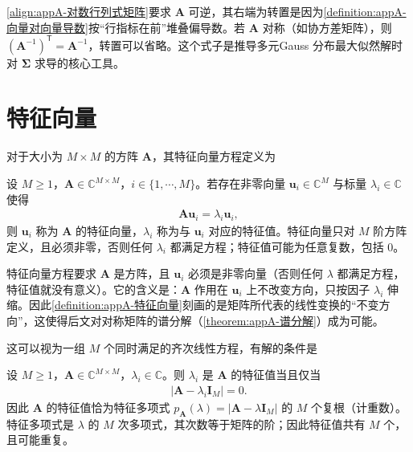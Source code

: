 \documentclass[../main.tex]{subfiles}
\begin{document}
\begin{remark}
\eqref{align:appA-对数行列式矩阵}要求 $\bm{A}$ 可逆，其右端为转置是因为\cref{definition:appA-向量对向量导数}按“行指标在前”堆叠偏导数。若 $\bm{A}$ 对称（如协方差矩阵），则 $(\bm{A}^{-1})^{\mathsf{T}}=\bm{A}^{-1}$，转置可以省略。这个式子是推导多元Gauss 分布最大似然解时对 $\bm{\Sigma}$ 求导的核心工具。
\end{remark}

\section{特征向量}\label{section:appA-特征向量}

对于大小为 $M\times M$ 的方阵 $\bm{A}$，其特征向量方程定义为
\begin{definition}[特征向量与特征值]\label{definition:appA-特征向量}
设 $M\geqslant1$，$\bm{A}\in\mathbb{C}^{M\times M}$，$i\in\{1,\cdots,M\}$。若存在非零向量 $\bm{u}_i\in\mathbb{C}^{M}$ 与标量 $\lambda_i\in\mathbb{C}$ 使得
\begin{align}
  \bm{A}\bm{u}_i=\lambda_i\bm{u}_i,
  \label{align:appA-特征方程定义}
\end{align}
则 $\bm{u}_i$ 称为 $\bm{A}$ 的特征向量，$\lambda_i$ 称为与 $\bm{u}_i$ 对应的特征值。特征向量只对 $M$ 阶方阵定义，且必须非零，否则任何 $\lambda_i$ 都满足方程；特征值可能为任意复数，包括 $0$。
\end{definition}

\begin{remark}
特征向量方程要求 $\bm{A}$ 是方阵，且 $\bm{u}_i$ 必须是非零向量（否则任何 $\lambda$ 都满足方程，特征值就没有意义）。它的含义是：$\bm{A}$ 作用在 $\bm{u}_i$ 上不改变方向，只按因子 $\lambda_i$ 伸缩。因此\cref{definition:appA-特征向量}刻画的是矩阵所代表的线性变换的“不变方向”，这使得后文对对称矩阵的谱分解（\cref{theorem:appA-谱分解}）成为可能。
\end{remark}

这可以视为一组 $M$ 个同时满足的齐次线性方程，有解的条件是
\begin{proposition}[特征方程]\label{proposition:appA-特征方程}
设 $M\geqslant1$，$\bm{A}\in\mathbb{C}^{M\times M}$，$\lambda_i\in\mathbb{C}$。则 $\lambda_i$ 是 $\bm{A}$ 的特征值当且仅当
\begin{align}
  |\bm{A}-\lambda_i\bm{I}_M|=0.
  \label{align:appA-特征方程}
\end{align}
因此 $\bm{A}$ 的特征值恰为特征多项式 $p_{\bm{A}}(\lambda)=|\bm{A}-\lambda\bm{I}_M|$ 的 $M$ 个复根（计重数）。特征多项式是 $\lambda$ 的 $M$ 次多项式，其次数等于矩阵的阶；因此特征值共有 $M$ 个，且可能重复。
\end{proposition}
\end{document}
